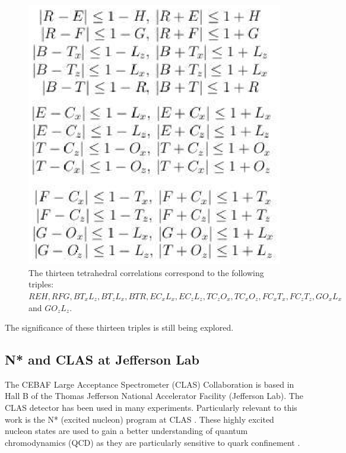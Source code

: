 \documentclass[a4paper,12pt]{article}
\begin{document}
\newpage
\begin{figure}[!ht]
 \begin{center}
  \includegraphics[scale=0.7]{ineqs.eps}
  \caption{The thirteen tetrahedral correlations correspond to the following triples: $REH, RFG, BT_{x}L_{z}, BT_{z}L_{x}, BTR, EC_{x}L_{x}, EC_{z}L_{z}, TC_{z}O_{x}, TC_{x}O_{z}, FC_{x}T_{x}, FC_{z}T_{z}, GO_{x}L_{x}$ and $GO_{z}L_{z}$.}
 \end{center}
\end{figure}

The significance of these thirteen triples is still being explored.
\newpage
\subsection{N* and CLAS at Jefferson Lab}
The CEBAF Large Acceptance Spectrometer (CLAS) Collaboration is based in Hall B of the Thomas Jefferson National Accelerator Facility (Jefferson Lab).  The CLAS detector has been used in many experiments.  Particularly relevant to this work is the N* (excited nucleon) program at CLAS \cite{clas}.  These highly excited nucleon states are used to gain a better understanding of quantum chromodynamics (QCD) as they are particularly sensitive to quark confinement \cite{nstar}.
\end{document}
